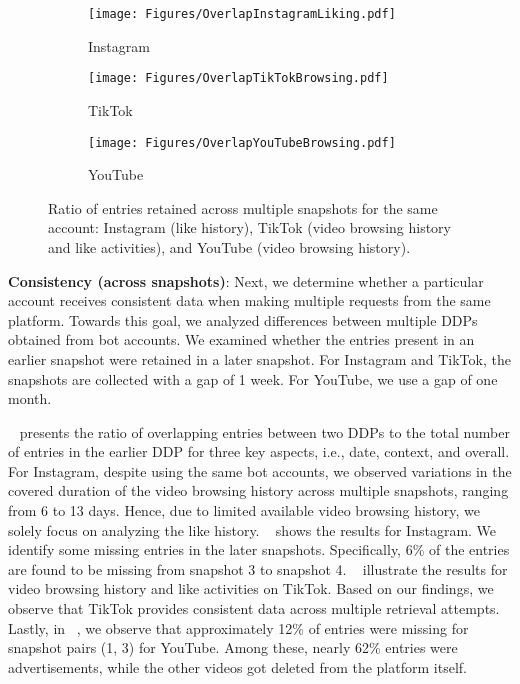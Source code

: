 \begin{figure*}[t]
\centering
    \begin{subfigure}[t]{0.33\textwidth}
        \centering
        \texttt{[image: Figures/OverlapInstagramLiking.pdf]}
        \caption{Instagram}
        \label{fig:IT-consistency}
    \end{subfigure}
    \hfill
    \begin{subfigure}[t]{0.33\textwidth}
        \centering
        \texttt{[image: Figures/OverlapTikTokBrowsing.pdf]}
        \caption{TikTok}
        \label{fig:TT-consistency}
    \end{subfigure}
    \hfill
    \begin{subfigure}[t]{0.33\textwidth}
        \centering
        \texttt{[image: Figures/OverlapYouTubeBrowsing.pdf]}
        \caption{YouTube}
        \label{fig:YT-consistency}
    \end{subfigure}
    \caption{ Ratio of entries retained across multiple snapshots for the same account: Instagram (like history), TikTok (video browsing history and like activities), and YouTube (video browsing history).}
    \label{fig:within-consistency}
\end{figure*}

\noindent
\textbf{Consistency (across snapshots)}:
Next, we determine whether a particular account receives consistent data when making multiple requests from the same platform.
Towards this goal, we analyzed differences between multiple DDPs obtained from bot accounts. We examined whether the entries present in an earlier snapshot were retained in a later snapshot. For Instagram and TikTok, the snapshots are collected with a gap of 1 week. For YouTube, we use a gap of one month.

~ presents the ratio of overlapping entries between two DDPs to the total number of entries in the earlier DDP for three key aspects, i.e., date, context, and overall.
For Instagram, despite using the same bot accounts, we observed variations in the covered duration of the video browsing history across multiple snapshots, ranging from 6 to 13 days.
Hence, due to limited available video browsing history, we solely focus on analyzing the like history.
~ shows the results for Instagram.
We identify some missing entries in the later snapshots.
Specifically, 6\% of the entries are found to be missing from snapshot 3 to snapshot 4.
~ illustrate the results for video browsing history and like activities on TikTok.
Based on our findings, we observe that TikTok provides consistent data across multiple retrieval attempts.
Lastly, in ~, %
we observe that approximately 12\% of entries were missing for snapshot pairs (1, 3) for YouTube.
Among these, nearly 62\% entries  were advertisements, while the other videos got deleted from the platform itself.


